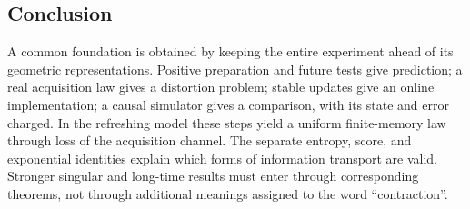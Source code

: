 \subsection{Conclusion}
A common foundation is obtained by keeping the entire experiment ahead of
its geometric representations. Positive preparation and future tests give
prediction; a real acquisition law gives a distortion problem; stable
updates give an online implementation; a causal simulator gives a
comparison, with its state and error charged. In the refreshing model these
steps yield a uniform finite-memory law through loss of the acquisition
channel. The separate entropy, score, and exponential identities explain
which forms of information transport are valid. Stronger singular and
long-time results must enter through corresponding theorems, not through
additional meanings assigned to the word ``contraction''.
